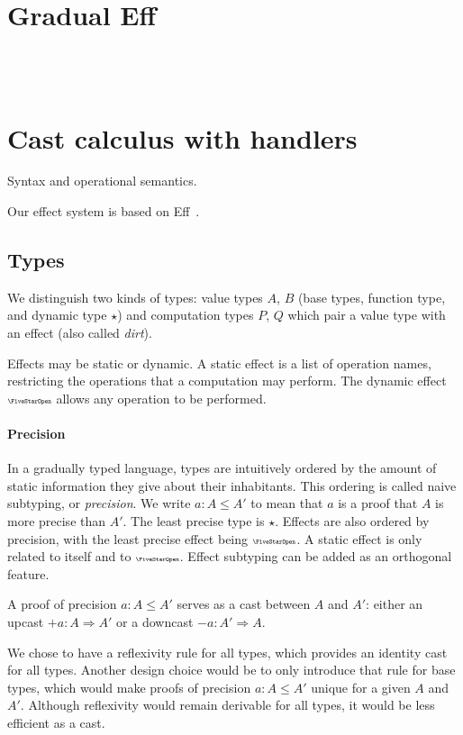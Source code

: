\section{Gradual Eff}

\GEmetavars\\[0pt]
\GEgrammar\\[5.0mm]
\GEdefnss

\section{Cast calculus with handlers}

Syntax and operational semantics.

Our effect system is based on Eff~\cite{bauer2015programming}.

\subsection{Types}

We distinguish two kinds of types: value types $A$, $B$ (base types, function type, and
dynamic type $\star$) and computation types $P$, $Q$ which pair a value type with an effect (also called \emph{dirt}).

Effects may be static or dynamic. A static effect is a list of operation names,
restricting the operations that a computation may perform. The dynamic effect $\effany$
allows any operation to be performed.

\paragraph{Precision}
In a gradually typed language, types are intuitively ordered by the amount of
static information they give about their inhabitants. This ordering is called
naive subtyping, or \emph{precision}.
We write $a : A \le A'$ to mean that $a$ is a proof that $A$ is more precise than $A'$.
The least precise type is $\star$.
Effects are also ordered by precision, with the least precise effect being $\effany$.
A static effect is only related to itself and to $\effany$.
Effect subtyping can be added as an orthogonal feature.

A proof of precision $a : A \le A'$ serves as a cast between $A$ and $A'$:
either an upcast $+a : A \Rightarrow A'$ or a downcast $-a : A' \Rightarrow A$.

We chose to have a reflexivity rule for all types, which provides an
identity cast for all types. Another design choice would be to only introduce
that rule for base types, which would make proofs of precision $a : A \le A'$
unique for a given $A$ and $A'$. Although reflexivity would remain derivable
for all types, it would be less efficient as a cast.

